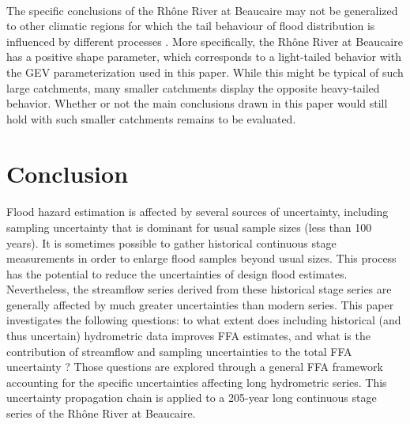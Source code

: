 \documentclass[11pt]{article}
\begin{document}
    \paragraph{}
    The specific conclusions of the Rhône River at Beaucaire may not be generalized to other climatic regions for which the tail behaviour of flood distribution is influenced by different processes \citep{merz_understanding_2022}. More specifically, the Rhône River at Beaucaire has a positive shape parameter, which corresponds to a light-tailed behavior with the GEV parameterization used in this paper. While this might be typical of such large catchments, many smaller catchments display the opposite heavy-tailed behavior. Whether or not the main conclusions drawn in this paper would still hold with such smaller catchments remains to be evaluated.

    
\section{Conclusion}
\label{sec:Conclusion}

    \paragraph{} Flood hazard estimation is affected by several sources of uncertainty, including sampling uncertainty that is dominant for usual sample sizes (less than 100 years). It is sometimes possible to gather historical continuous stage measurements in order to enlarge flood samples beyond usual sizes. This process has the potential to reduce the uncertainties of design flood estimates. Nevertheless, the streamflow series derived from these historical stage series are generally affected by much greater uncertainties than modern series. This paper investigates the following questions: to what extent does including historical (and thus uncertain) hydrometric data improves FFA estimates, and what is the contribution of streamflow and sampling uncertainties to the total FFA uncertainty ? Those questions are explored through a general FFA framework accounting for the specific uncertainties affecting long hydrometric series. This uncertainty propagation chain is applied to a 205-year long continuous stage series of the Rhône River at Beaucaire.
\end{document}
